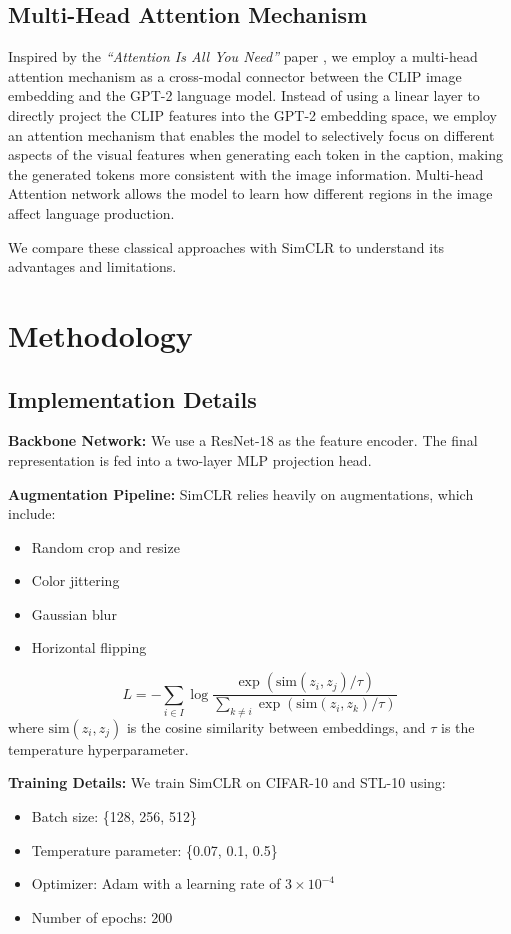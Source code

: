 \documentclass[11pt]{article}
\begin{document}
    \subsection{Multi-Head Attention Mechanism}
    Inspired by the \textit{``Attention Is All You Need''} paper 
    \cite{vaswani2017attention}, we employ a multi-head attention 
    mechanism as a cross-modal connector between the CLIP image embedding
    and the GPT-2 language model. Instead of using a linear layer to directly 
    project the CLIP features into the GPT-2 embedding space, we employ an 
    attention mechanism that enables the model to selectively focus on 
    different aspects of the visual features when generating each token 
    in the caption, making the generated tokens more consistent with the 
    image information. Multi-head Attention network allows the model to 
    learn how different regions in the image affect language production.

We compare these classical approaches with SimCLR to understand its advantages and limitations.
\pagebreak
\section{Methodology}

\subsection{Implementation Details}
\textbf{Backbone Network:} We use a ResNet-18 as the feature encoder. The final representation is fed into
a two-layer MLP projection head.

\textbf{Augmentation Pipeline:} SimCLR relies heavily on augmentations, which include:
\begin{itemize}
  \item Random crop and resize
  \item Color jittering
  \item Gaussian blur
  \item Horizontal flipping
\end{itemize}
\begin{equation}
    L = -\sum_{i \in I} \log \frac{\exp(\text{sim}(z_i, z_j)/\tau)}{\sum_{k \neq i}\exp(\text{sim}(z_i, z_k)/\tau)}
    \end{equation}
    where $\text{sim}(z_i, z_j)$ is the cosine similarity between embeddings, and $\tau$ is the temperature hyperparameter.
    
\textbf{Training Details:} We train SimCLR on CIFAR-10 and STL-10 using:
\begin{itemize}
  \item Batch size: \{128, 256, 512\}
  \item Temperature parameter: \{0.07, 0.1, 0.5\}
  \item Optimizer: Adam with a learning rate of $3 \times 10^{-4}$
  \item Number of epochs: 200
\end{itemize}
\end{document}
